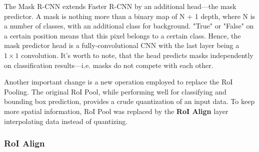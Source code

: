 \documentclass[thesis=B,english]{FITthesis}[2019/12/23]
\begin{document}
The Mask R-CNN\cite{mask_rcnn} extends Faster R-CNN by an additional head---the mask predictor. A mask is nothing more than a binary map of N + 1 depth, where N is a number of classes, with an additional class for background. "True" or "False" on a certain position means that this pixel belongs to a certain class. Hence, the mask predictor head is a fully-convolutional CNN with the last layer being a $1 \times 1$ convolution. It's worth to note, that the head predicts masks independently on classification results---i.e. masks do not compete with each other.

Another important change is a new operation employed to replace the RoI Pooling. The original RoI Pool, while performing well for classifying and bounding box prediction, provides a crude quantization of an input data. To keep more spatial information, RoI Pool was replaced by the \textbf{RoI Align} layer interpolating data instead of quantizing.

\subsubsection{RoI Align}
\end{document}
